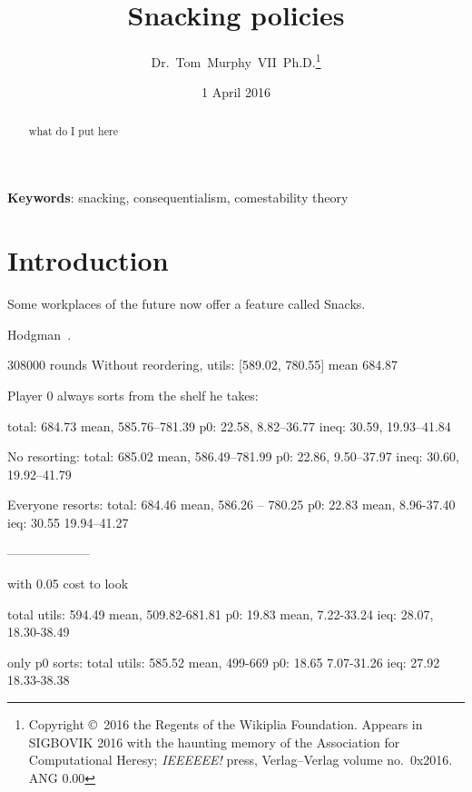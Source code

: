 \documentclass[twocolumn]{article}
\begin{document}
 

\title{Snacking policies}
\author{Dr.~Tom~Murphy~VII~Ph.D.\thanks{
    Copyright \copyright\ 2016 the Regents of the Wikiplia Foundation.
    Appears in SIGBOVIK 2016 with the haunting memory of the
    Association for Computational Heresy; {\em IEEEEEE!} press,
    Verlag--Verlag volume no.~0x2016. ANG 0.00} }

\renewcommand\>{$>$}
\newcommand\<{$<$}

\date{1 April 2016}

\maketitle

\begin{abstract}
what do I put here
\end{abstract}

\vspace{1em}
{\noindent \small {\bf Keywords}:
  snacking, consequentialism, comestability theory
}

\section{Introduction}

Some workplaces of the future now offer a feature called Snacks.

Hodgman~\cite{hodgman2016snacks}.


308000 rounds
Without reordering, utils: [589.02, 780.55] mean 684.87

Player 0 always sorts from the shelf he takes:


total: 684.73 mean, 585.76--781.39
p0: 22.58, 8.82--36.77
ineq: 30.59, 19.93--41.84

No resorting:
total: 685.02 mean, 586.49--781.99
p0: 22.86, 9.50--37.97
ineq: 30.60, 19.92--41.79

Everyone resorts:
total: 684.46 mean, 586.26 -- 780.25
p0: 22.83 mean, 8.96-37.40
ieq: 30.55 19.94--41.27


--------------------

with 0.05 cost to look

total utils: 594.49 mean, 509.82-681.81
p0: 19.83 mean, 7.22-33.24
ieq: 28.07, 18.30-38.49

only p0 sorts:
total utils: 585.52 mean, 499-669
p0: 18.65 7.07-31.26
ieq: 27.92 18.33-38.38
\end{document}

